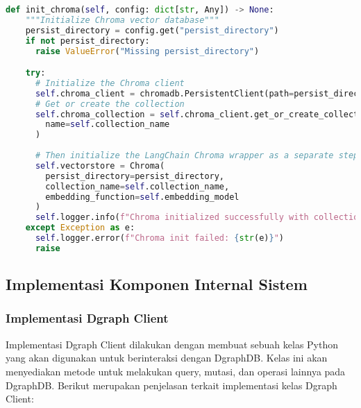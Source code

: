 \begin{lstlisting}[language=python]
  def init_chroma(self, config: dict[str, Any]) -> None:
    """Initialize Chroma vector database"""
    persist_directory = config.get("persist_directory")
    if not persist_directory:
      raise ValueError("Missing persist_directory")

    try:
      # Initialize the Chroma client
      self.chroma_client = chromadb.PersistentClient(path=persist_directory)
      # Get or create the collection
      self.chroma_collection = self.chroma_client.get_or_create_collection(
        name=self.collection_name
      )
      
      # Then initialize the LangChain Chroma wrapper as a separate step
      self.vectorstore = Chroma(
        persist_directory=persist_directory,
        collection_name=self.collection_name,
        embedding_function=self.embedding_model
      )
      self.logger.info(f"Chroma initialized successfully with collection: {self.collection_name}")
    except Exception as e:
      self.logger.error(f"Chroma init failed: {str(e)}")
      raise
\end{lstlisting}

\subsection{Implementasi Komponen Internal Sistem}

\subsubsection{Implementasi Dgraph Client}

Implementasi Dgraph Client dilakukan dengan membuat sebuah kelas Python yang akan digunakan untuk berinteraksi dengan DgraphDB. Kelas ini akan menyediakan metode untuk melakukan query, mutasi, dan operasi lainnya pada DgraphDB. Berikut merupakan penjelasan terkait implementasi kelas Dgraph Client:

